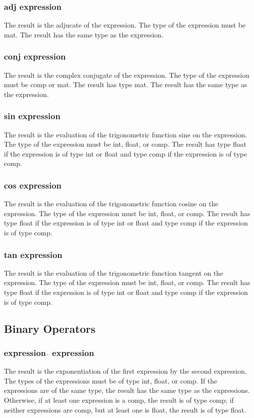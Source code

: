 \subsubsection{adj expression}
The result is the adjucate of the expression. The type of the expression must be mat. The result has the same type as the expression.
\subsubsection{conj expression}
The result is the complex conjugate of the expression. The type of the expression must be comp or mat. The result has type mat. The result has the same type as the expression.
\subsubsection{sin expression}
The result is the evaluation of the trigonometric function sine on the expression. The type of the expression must be int, float, or comp. The result has type float if the expression is of type int or float and type comp if the expression is of type comp.
\subsubsection{cos expression}
The result is the evaluation of the trigonometric function cosine on the expression. The type of the expression must be int, float, or comp. The result has type float if the expression is of type int or float and type comp if the expression is of type comp.
\subsubsection{tan expression}
The result is the evaluation of the trigonometric function tangent on the expression. The type of the expression must be int, float, or comp. The result has type float if the expression is of type int or float and type comp if the expression is of type comp.
\subsection{Binary Operators}
\subsubsection{expression $\hat{}$ expression}
The result is the exponentiation of the first expression by the second expression. The types of the expressions must be of type int, float, or comp. If the expressions are of the same type, the result has the same type as the expressions. Otherwise, if at least one expression is a comp, the result is of type comp; if neither expressions are comp, but at least one is float, the result is of type float.
